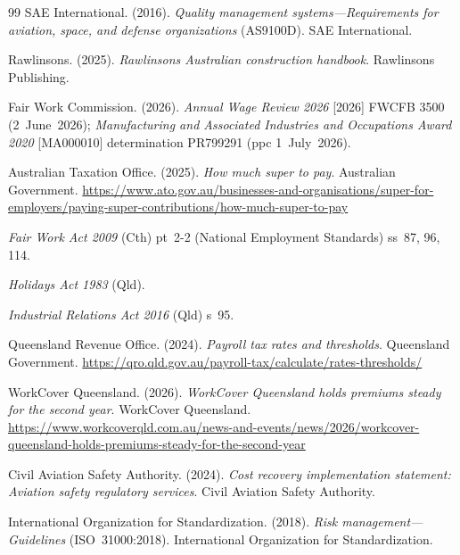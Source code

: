 \documentclass[12pt,a4paper]{article}
\numberwithin{table}{section}
\numberwithin{figure}{section}
\begin{document}
\begin{thebibliography}{99}
SAE International. (2016). \textit{Quality management systems---Requirements for aviation, space, and defense organizations} (AS9100D). SAE International.

Rawlinsons. (2025). \textit{Rawlinsons Australian construction handbook}. Rawlinsons Publishing.

Fair Work Commission. (2026). \textit{Annual Wage Review 2026} [2026] FWCFB 3500 (2~June~2026); \textit{Manufacturing and Associated Industries and Occupations Award 2020} [MA000010] determination PR799291 (ppc 1~July~2026).

Australian Taxation Office. (2025). \textit{How much super to pay}. Australian Government. \url{https://www.ato.gov.au/businesses-and-organisations/super-for-employers/paying-super-contributions/how-much-super-to-pay}

\textit{Fair Work Act 2009} (Cth) pt~2-2 (National Employment Standards) ss~87, 96, 114.

\textit{Holidays Act 1983} (Qld).

\textit{Industrial Relations Act 2016} (Qld) s~95.

Queensland Revenue Office. (2024). \textit{Payroll tax rates and thresholds}. Queensland Government. \url{https://qro.qld.gov.au/payroll-tax/calculate/rates-thresholds/}

WorkCover Queensland. (2026). \textit{WorkCover Queensland holds premiums steady for the second year}. WorkCover Queensland. \url{https://www.workcoverqld.com.au/news-and-events/news/2026/workcover-queensland-holds-premiums-steady-for-the-second-year}

Civil Aviation Safety Authority. (2024). \textit{Cost recovery implementation statement: Aviation safety regulatory services}. Civil Aviation Safety Authority.

International Organization for Standardization. (2018). \textit{Risk management---Guidelines} (ISO~31000:2018). International Organization for Standardization.


\end{thebibliography}
\end{document}

